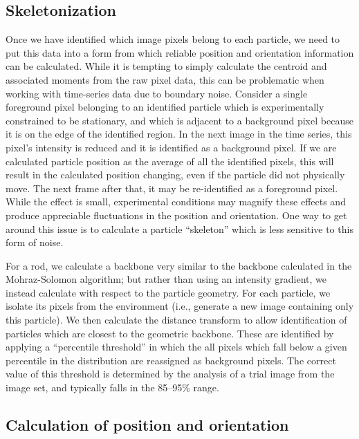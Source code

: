 \subsection{Skeletonization}

Once we have identified which image pixels belong to each particle, we need to put this data into a form from
which reliable position and orientation information can be calculated.  While it is tempting to simply
calculate the centroid and associated moments from the raw pixel data, this can be problematic when working with
time-series data due to boundary noise. Consider a single foreground pixel belonging to 
an identified particle which is experimentally
constrained to be stationary, and which is adjacent to a background pixel because it is on the edge of the identified 
region. In the next image in the time series, this pixel's intensity is reduced and it is identified as a background
pixel.  If we are calculated particle position as the average of all the identified pixels, this will result in 
the calculated position changing, even if the particle did not physically move. The next frame after that, it 
may be re-identified as a foreground pixel.  While the effect is small, experimental conditions may magnify
these effects and produce appreciable fluctuations in the position and orientation. One way to get around this issue
is to calculate a particle ``skeleton'' which is less sensitive to this form of noise.~\cite{soille-book}

For a rod, we calculate a backbone very similar to the backbone calculated in the Mohraz-Solomon algorithm; but rather 
than using an intensity gradient, we instead calculate with respect to the particle geometry. For each particle, we 
isolate its pixels from the environment (i.e., generate a new image containing only this particle). We then
calculate the distance transform to allow identification of particles which are closest to the 
geometric backbone.  These are identified by applying a ``percentile threshold'' in which the all pixels which
fall below a given percentile in the distribution are reassigned as background pixels. 
The correct value of this threshold is determined by the analysis of a trial image from the image set,
and typically falls in the 85--95\% range.

\subsection{Calculation of position and orientation}

